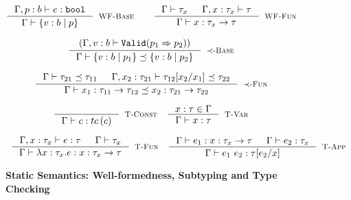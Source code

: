 \begin{figure}[ht!]


$$\inference
    {\hastype{\Gamma, p:b}{\reft}{\tbbool}}
    {\isWellFormed{\Gamma}{\tref{b}{p}}}
    [\wtBase]
\qquad
\inference
    {
    \isWellFormed{\Gamma}{\tau_x} &&
	\isWellFormed{\Gamma, x:\tau_x}{\tau}
    }
    {\isWellFormed{\Gamma}{\tfun{x}{\tau_x}{\tau}}}
    [\wtFun]
$$


\medskip {}

$$
\inference
   {(\Gamma, v:b \vdash \texttt{Valid}(p_1 \Rightarrow p_2))}
   {\isSubType{\Gamma}{\tref{b}{p_1}}{\tref{b}{p_2}}}
   [\tsubBase]
$$

$$
\inference
   {\isSubType{\Gamma}{\tau_{21}}{\tau_{11}} &
	\isSubType{\Gamma, x_2:{\tau_{21}}}{\SUBST{\tau_{12}}{x_1}{x_2}}{\tau_{22}}	
   }
   {\isSubType{\Gamma}
	  {\tfun{x_1}{\tau_{11}}{\tau_{12}}}
	  {\tfun{x_2}{\tau_{21}}{\tau_{22}}}
}[\tsubFun]
$$


\medskip {}

\begin{comment}
$$\begin{array}{cc}

\inference
  {  \hastype{\Gamma}{e}{\tau_2} && \isSubType{\Gamma}{\tau_2}{\tau_1} 
  && \isWellFormed{\Gamma}{\tau_1}
  }
  {\hastype{\Gamma}{e}{\tau_1}}
  [\tsub]
\end{array}$$
\end{comment}
$$\begin{array}{cc}

\inference
  {}
  {\hastype{\Gamma}{c}{\tc{c}}}
  [\tconst]
&
\inference
  {x:\tau \in \Gamma}
  {\hastype{\Gamma}{x}{\tau}} 
  [\tvariable]

\end{array}$$

$$\begin{array}{cc}

\inference
  {\hastype{\Gamma, x:\tau_x}{e}{\tau} &&     
  \isWellFormed{\Gamma}{\tau_x}
  }
  {\hastype{\Gamma}{\efunt{x}{\tau_x}{e}}{\tfun{x}{\tau_x}{\tau}}}
  [\tfunction]
&
\inference
  {\hastype{\Gamma}{e_1}{\tfun{x}{\tau_x}{\tau}} &&
   \hastype{\Gamma}{e_2}{\tau_x}
  }
  {\hastype{\Gamma}{\eapp{e_1}{e_2}}{\tau[e_2/x]}} 
  [\tapp]

\end{array}$$

\caption{\textbf{Static Semantics: Well-formedness, Subtyping and Type Checking}}
\label{fig:rules}
\end{figure}